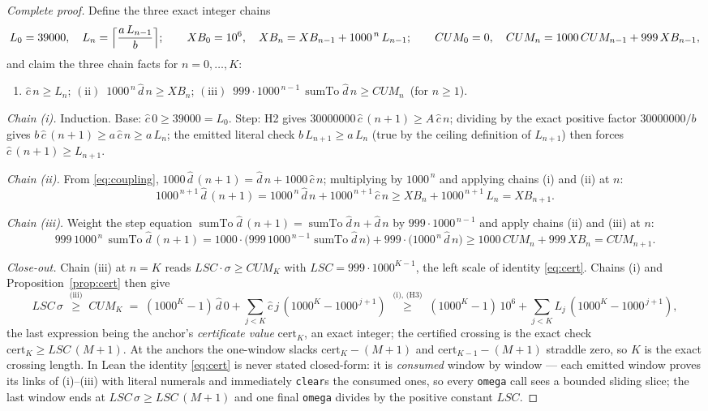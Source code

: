 \documentclass[11pt]{article}
\newcommand{\dhat}{\widehat{d}}
\newcommand{\chat}{\widehat{c}}
\newcommand{\sumto}{\operatorname{sumTo}}
\theoremstyle{plain}
\theoremstyle{definition}
\begin{document}
\begin{proof}[Complete proof]
Define the three exact integer chains
\[
L_0=39000,\quad L_n=\Bigl\lceil\frac{a\,L_{n-1}}{b}\Bigr\rceil;
\qquad
XB_0=10^{6},\quad XB_n=XB_{n-1}+1000^{\,n}\,L_{n-1};
\qquad
CUM_0=0,\quad CUM_n=1000\,CUM_{n-1}+999\,XB_{n-1},
\]
and claim the three chain facts for $n=0,\dots,K$:
\begin{enumerate}
\item[$\mathrm{(i)}$] $\chat\,n\ge L_n$;\qquad
$\mathrm{(ii)}$\ $1000^{\,n}\,\dhat\,n\ge XB_n$;\qquad
$\mathrm{(iii)}$\ $999\cdot 1000^{\,n-1}\,\sumto\dhat\,n\ge CUM_n$\ (for $n\ge 1$).
\end{enumerate}
\emph{Chain (i).} Induction. Base: $\chat\,0\ge 39000=L_0$. Step: H2 gives
$30000000\,\chat\,(n+1)\ge A\,\chat\,n$; dividing by the exact positive factor
$30000000/b$ gives $b\,\chat\,(n+1)\ge a\,\chat\,n\ge a\,L_n$; the emitted literal check
$b\,L_{n+1}\ge a\,L_n$ (true by the ceiling definition of $L_{n+1}$) then forces
$\chat\,(n+1)\ge L_{n+1}$.

\emph{Chain (ii).} From \eqref{eq:coupling}, $1000\,\dhat\,(n+1)=\dhat\,n+1000\,\chat\,n$;
multiplying by $1000^{\,n}$ and applying chains (i) and (ii) at $n$:
\[
1000^{\,n+1}\,\dhat\,(n+1)=1000^{\,n}\,\dhat\,n+1000^{\,n+1}\,\chat\,n
\ge XB_n+1000^{\,n+1}\,L_n=XB_{n+1}.
\]

\emph{Chain (iii).} Weight the step equation $\sumto\dhat\,(n+1)=\sumto\dhat\,n+\dhat\,n$
by $999\cdot 1000^{\,n-1}$ and apply chains (ii) and (iii) at $n$:
\[
999\,1000^{\,n}\,\sumto\dhat\,(n+1)
=1000\cdot\bigl(999\,1000^{\,n-1}\sumto\dhat\,n\bigr)+999\cdot\bigl(1000^{\,n}\,\dhat\,n\bigr)
\ge 1000\,CUM_n+999\,XB_n=CUM_{n+1}.
\]

\emph{Close-out.} Chain (iii) at $n=K$ reads $LSC\cdot\sigma\ge CUM_K$ with
$LSC=999\cdot 1000^{K-1}$, the left scale of identity \eqref{eq:cert}. Chains (i) and
Proposition~\ref{prop:cert} then give
\[
LSC\,\sigma\;\overset{\text{(iii)}}{\ge}\;CUM_K\;=\;
(1000^{K}-1)\,\dhat\,0+\sum_{j<K}\chat\,j\,(1000^{K}-1000^{\,j+1})
\;\overset{\text{(i), (H3)}}{\ge}\;
(1000^{K}-1)\,10^{6}+\sum_{j<K}L_j\,(1000^{K}-1000^{\,j+1}),
\]
the last expression being the anchor's \emph{certificate value} $\mathrm{cert}_K$, an
exact integer; the certified crossing is the exact check $\mathrm{cert}_K\ge LSC\,(M+1)$.
At the anchors the one-window slacks $\mathrm{cert}_K-(M+1)$ and $\mathrm{cert}_{K-1}-(M+1)$
straddle zero, so $K$ is the exact crossing length. In Lean the identity \eqref{eq:cert}
is never stated closed-form: it is \emph{consumed} window by window --- each emitted
window proves its links of (i)--(iii) with literal numerals and immediately
\texttt{clear}s the consumed ones, so every \texttt{omega} call sees a bounded sliding
slice; the last window ends at $LSC\,\sigma\ge LSC\,(M+1)$ and one final \texttt{omega}
divides by the positive constant $LSC$.
\end{proof}
\end{document}
